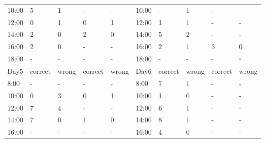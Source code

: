 \begin{table}[]
\begin{tabular}{l|ll|ll|l|ll|ll|}
\multicolumn{1}{|l|}{10:00} & 5                   & 1                 & -                   & -                 & 10:00 & -                   & 1                 & -                   & -                 \\
\multicolumn{1}{|l|}{12:00} & 0                   & 1                 & 0                   & 1                 & 12:00 & 1                   & 1                 & -                   & -                 \\
\multicolumn{1}{|l|}{14:00} & 2                   & 0                 & 2                   & 0                 & 14:00 & 5                   & 2                 & -                   & -                 \\
\multicolumn{1}{|l|}{16:00} & 2                   & 0                 & -                   & -                 & 16:00 & 2                   & 1                 & 3                   & 0                 \\
\multicolumn{1}{|l|}{18:00} & -                   & -                 & -                   & -                 & 18:00 & -                   & -                 & -                   & -                 \\ \hline
\multicolumn{1}{|l|}{Day5}  & correct             & wrong             & correct             & wrong             & Day6  & correct             & wrong             & correct             & wrong             \\ \hline
\multicolumn{1}{|l|}{8:00}  & -                   & -                 & -                   & -                 & 8:00  & 7                   & 1                 & -                   & -                 \\
\multicolumn{1}{|l|}{10:00} & 0                   & 3                 & 0                   & 1                 & 10:00 & 1                   & 0                 & -                   & -                 \\
\multicolumn{1}{|l|}{12:00} & 7                   & 4                 & -                   & -                 & 12:00 & 6                   & 1                 & -                   & -                 \\
\multicolumn{1}{|l|}{14:00} & 7                   & 0                 & 1                   & 0                 & 14:00 & 8                   & 1                 & -                   & -                 \\
\multicolumn{1}{|l|}{16:00} & -                   & -                 & -                   & -                 & 16:00 & 4                   & 0                 & -                   & -                 \\

\end{tabular}
\end{table}
